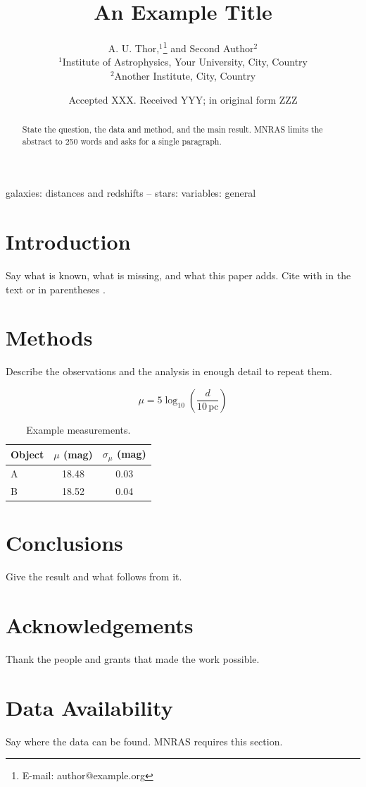\documentclass[fleqn,usenatbib]{mnras}
\title[An Example Title]{An Example Title}
\author[A. U. Thor et al.]{
A. U. Thor,$^{1}$\thanks{E-mail: author@example.org}
and Second Author$^{2}$
\\
$^{1}$Institute of Astrophysics, Your University, City, Country\\
$^{2}$Another Institute, City, Country
}
\date{Accepted XXX. Received YYY; in original form ZZZ}
\begin{document}
\label{firstpage}
\pagerange{\pageref{firstpage}--\pageref{lastpage}}
\maketitle

\begin{abstract}
State the question, the data and method, and the main result. MNRAS limits
the abstract to 250 words and asks for a single paragraph.
\end{abstract}

\begin{keywords}
galaxies: distances and redshifts -- stars: variables: general
\end{keywords}

\section{Introduction}

Say what is known, what is missing, and what this paper adds. Cite with
\citet{einstein1905} in the text or in parentheses \citep{knuth1984}.

\section{Methods}

Describe the observations and the analysis in enough detail to repeat them.

\begin{equation}
  \mu = 5 \log_{10}\left(\frac{d}{10\,\mathrm{pc}}\right)
  \label{eq:distance}
\end{equation}

\begin{table}
  \centering
  \caption{Example measurements.}
  \label{tab:results}
  \begin{tabular}{lcc}
    \hline
    Object & $\mu$ (mag) & $\sigma_\mu$ (mag) \\
    \hline
    A & 18.48 & 0.03 \\
    B & 18.52 & 0.04 \\
    \hline
  \end{tabular}
\end{table}

\section{Conclusions}

Give the result and what follows from it.

\section*{Acknowledgements}

Thank the people and grants that made the work possible.

\section*{Data Availability}

Say where the data can be found. MNRAS requires this section.




\bsp
\label{lastpage}
\end{document}
